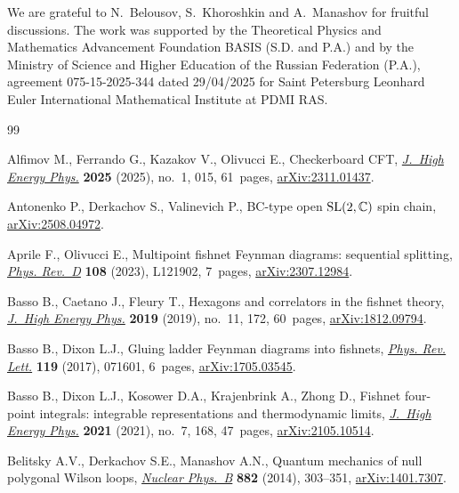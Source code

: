 \documentclass[pdftex]{sigma}
\numberwithin{equation}{section}
\begin{document}
We are grateful to N.~Belousov, S.~Khoroshkin and A.~Manashov for fruitful discussions.
The work was supported by the
Theoretical Physics and Mathematics Advancement Foundation BASIS (S.D. and P.A.) and by the Ministry of Science and Higher Education of the Russian Federation (P.A.), agreement 075-15-2025-344 dated 29/04/2025 for Saint Petersburg Leonhard Euler International Mathematical Institute at PDMI RAS.

\begin{thebibliography}{99}
\footnotesize\itemsep=0pt

Alfimov M., Ferrando G., Kazakov V., Olivucci E., Checkerboard {CFT},
 \href{https://doi.org/10.1007/jhep01(2025)015}{\textit{J.~High Energy Phys.}}
 \textbf{2025} (2025), no.~1, 015, 61~pages,
 \href{http://arxiv.org/abs/2311.01437}{arXiv:2311.01437}.

Antonenko P., Derkachov S., Valinevich P., {BC}-type open ${\rm
 SL}(2,\mathbb{C})$ spin chain,
 \href{http://arxiv.org/abs/2508.04972}{arXiv:2508.04972}.

Aprile F., Olivucci E., Multipoint fishnet {F}eynman diagrams: sequential
 splitting, \href{https://doi.org/10.1103/physrevd.108.l121902}{\textit{Phys.
 Rev.~D}} \textbf{108} (2023), L121902, 7~pages,
 \href{http://arxiv.org/abs/2307.12984}{arXiv:2307.12984}.

Basso B., Caetano J., Fleury T., Hexagons and correlators in the fishnet
 theory, \href{https://doi.org/10.1007/jhep11(2019)172}{\textit{J.~High Energy
 Phys.}} \textbf{2019} (2019), no.~11, 172, 60~pages,
 \href{http://arxiv.org/abs/1812.09794}{arXiv:1812.09794}.

Basso B., Dixon L.J., Gluing ladder {F}eynman diagrams into fishnets,
 \href{https://doi.org/10.1103/PhysRevLett.119.071601}{\textit{Phys. Rev.
 Lett.}} \textbf{119} (2017), 071601, 6~pages,
 \href{http://arxiv.org/abs/1705.03545}{arXiv:1705.03545}.

Basso B., Dixon L.J., Kosower D.A., Krajenbrink A., Zhong D., Fishnet
 four-point integrals: integrable representations and thermodynamic limits,
 \href{https://doi.org/10.1007/jhep07(2021)168}{\textit{J.~High Energy Phys.}}
 \textbf{2021} (2021), no.~7, 168, 47~pages,
 \href{http://arxiv.org/abs/2105.10514}{arXiv:2105.10514}.

Belitsky A.V., Derkachov S.E., Manashov A.N., Quantum mechanics of null
 polygonal {W}ilson loops,
 \href{https://doi.org/10.1016/j.nuclphysb.2014.03.007}{\textit{Nuclear
 Phys.~B}} \textbf{882} (2014), 303--351,
 \href{http://arxiv.org/abs/1401.7307}{arXiv:1401.7307}.


\end{thebibliography}
\end{document}
